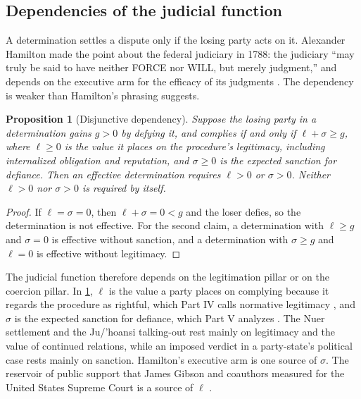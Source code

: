 \documentclass[11pt,letterpaper]{article}
\newtheorem{proposition}[theorem]{Proposition}
\theoremstyle{definition}
\theoremstyle{remark}
\begin{document}
\subsection{Dependencies of the judicial function}
\label{subsec:dependencies}

A determination settles a dispute only if the losing party acts on it. Alexander Hamilton made the point about the federal judiciary in 1788: the judiciary ``may truly be said to have neither FORCE nor WILL, but merely judgment,'' and depends on the executive arm for the efficacy of its judgments \citep{hamilton1788}. The dependency is weaker than Hamilton's phrasing suggests.

\begin{proposition}[Disjunctive dependency]
\label{prop:judicial-power:disjunctive}
Suppose the losing party in a determination gains $g>0$ by defying it, and complies if and only if $\ell+\sigma\ge g$, where $\ell\ge 0$ is the value it places on the procedure's legitimacy, including internalized obligation and reputation, and $\sigma\ge 0$ is the expected sanction for defiance. Then an effective determination requires $\ell>0$ or $\sigma>0$. Neither $\ell>0$ nor $\sigma>0$ is required by itself.
\end{proposition}

\begin{proof}
If $\ell=\sigma=0$, then $\ell+\sigma=0<g$ and the loser defies, so the determination is not effective. For the second claim, a determination with $\ell\ge g$ and $\sigma=0$ is effective without sanction, and a determination with $\sigma\ge g$ and $\ell=0$ is effective without legitimacy.
\end{proof}

The judicial function therefore depends on the legitimation pillar or on the coercion pillar. In \cref{prop:judicial-power:disjunctive}, $\ell$ is the value a party places on complying because it regards the procedure as rightful, which Part IV calls normative legitimacy \citep{long2026ideological}, and $\sigma$ is the expected sanction for defiance, which Part V analyzes \citep{long2026coercive}. The Nuer settlement and the Ju/'hoansi talking-out rest mainly on legitimacy and the value of continued relations, while an imposed verdict in a party-state's political case rests mainly on sanction. Hamilton's executive arm is one source of $\sigma$. The reservoir of public support that James Gibson and coauthors measured for the United States Supreme Court is a source of $\ell$ \citep{gibson2003}.
\end{document}
